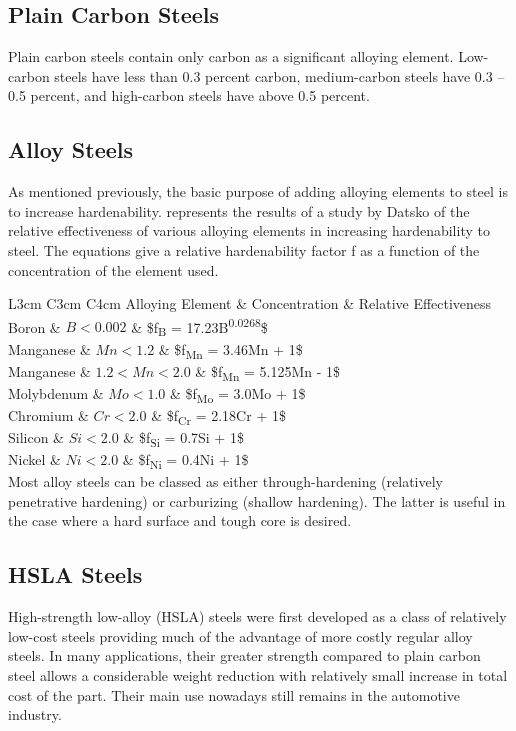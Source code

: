 \documentclass[a4paper,openany,12pt]{book}
\begin{document}
\subsection{Plain Carbon Steels}
\label{plain-carbon-steels}
Plain carbon steels contain only carbon as a significant alloying
element. Low-carbon steels have less than 0.3 percent carbon,
medium-carbon steels have 0.3 -- 0.5 percent, and high-carbon steels
have above 0.5 percent.

\subsection{Alloy Steels}
\label{alloy-steels}
As mentioned previously, the basic purpose of adding alloying elements
to steel is to increase hardenability. represents the results of a study
by Datsko \cite{datsko1977materials} of the relative effectiveness of
various alloying elements in increasing hardenability to steel. The
equations give a relative hardenability factor f as a function of the
concentration of the element used.


 L3cm C3cm C4cm Alloying Element \& Concentration \& Relative
Effectiveness\\
Boron \& \(B < 0.002\) \& \$f\textsubscript{B} = 17.23B\textsuperscript{0.0268}\$\\
Manganese \& \(Mn < 1.2\) \& \$f\textsubscript{Mn} = 3.46Mn + 1\$\\
Manganese \& \(1.2 < Mn < 2.0\) \& \$f\textsubscript{Mn} = 5.125Mn - 1\$\\
Molybdenum \& \(Mo < 1.0\) \& \$f\textsubscript{Mo} = 3.0Mo + 1\$\\
Chromium \& \(Cr < 2.0\) \& \$f\textsubscript{Cr} = 2.18Cr + 1\$\\
Silicon \& \(Si < 2.0\) \& \$f\textsubscript{Si} = 0.7Si + 1\$\\
Nickel \& \(Ni < 2.0\) \& \$f\textsubscript{Ni} = 0.4Ni + 1\$\\

Most alloy steels can be classed as either through-hardening (relatively
penetrative hardening) or carburizing (shallow hardening). The latter is
useful in the case where a hard surface and tough core is desired.

\subsection{HSLA Steels}
\label{hsla-steels}
High-strength low-alloy (HSLA) steels were first developed as a class of
relatively low-cost steels providing much of the advantage of more
costly regular alloy steels. In many applications, their greater
strength compared to plain carbon steel allows a considerable weight
reduction with relatively small increase in total cost of the part.
Their main use nowadays still remains in the automotive industry.
\end{document}
